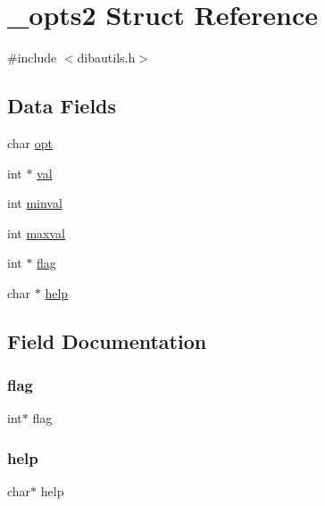 \hypertarget{struct__opts2}{}\section{\+\_\+opts2 Struct Reference}
\label{struct__opts2}


{\ttfamily \#include $<$dibautils.\+h$>$}

\subsection*{Data Fields}
\begin{DoxyCompactItemize}
\item 
char \hyperlink{struct__opts2_a6b9d817d08c1417f5c533eb8ad775312}{opt}
\item 
int $\ast$ \hyperlink{struct__opts2_a482251298d068445d0ecb6f0c6ed54a7}{val}
\item 
int \hyperlink{struct__opts2_a271861b7d4422e3cddf03d604408cf3a}{minval}
\item 
int \hyperlink{struct__opts2_ab78d5bc0b5eb537373d2ae9db01011b4}{maxval}
\item 
int $\ast$ \hyperlink{struct__opts2_a4f1a91bc2d61b12ffb90ff2857d6a4d8}{flag}
\item 
char $\ast$ \hyperlink{struct__opts2_a67b7e976c6444c3d7fab151527bdae33}{help}
\end{DoxyCompactItemize}


\subsection{Field Documentation}
\mbox{\label{struct__opts2_a4f1a91bc2d61b12ffb90ff2857d6a4d8}} 
\subsubsection{\texorpdfstring{flag}{flag}}
{\footnotesize\ttfamily int$\ast$ flag}

\mbox{\label{struct__opts2_a67b7e976c6444c3d7fab151527bdae33}} 
\subsubsection{\texorpdfstring{help}{help}}
{\footnotesize\ttfamily char$\ast$ help}

